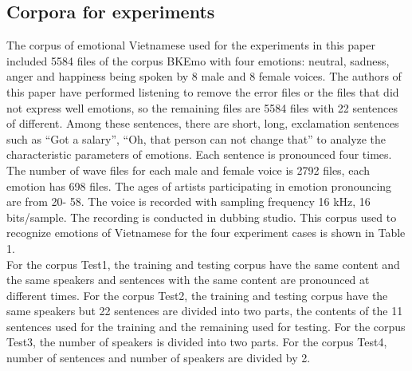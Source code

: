 \documentclass[a4paper,12pt]{article}
\begin{document}
\subsection{ Corpora for experiments}
The corpus of emotional Vietnamese used for the experiments in this paper included 5584
files of the corpus BKEmo \cite{8} with four emotions: neutral, sadness, anger and happiness
being spoken by 8 male and 8 female voices. The authors of this paper have performed
listening to remove the error files or the files that did not express well emotions, so the
remaining files are 5584 files with 22 sentences of different. Among these sentences, there are
short, long, exclamation sentences such as “Got a salary”, “Oh, that person can not change
that” to analyze the characteristic parameters of emotions. Each sentence is pronounced
four times. The number of wave files for each male and female voice is 2792 files, each
emotion has 698 files. The ages of artists participating in emotion pronouncing are from 20-
58. The voice is recorded with sampling frequency 16 kHz, 16 bits/sample. The recording is
conducted in dubbing studio. This corpus used to recognize emotions of Vietnamese for the
four experiment cases is shown in Table 1.
\\
 For the corpus Test1, the training and testing corpus have the same content and the
same speakers and sentences with the same content are pronounced at different times. For
the corpus Test2, the training and testing corpus have the same speakers but 22 sentences
are divided into two parts, the contents of the 11 sentences used for the training and the
remaining used for testing. For the corpus Test3, the number of speakers is divided into two
parts. For the corpus Test4, number of sentences and number of speakers are divided by 2.
\end{document}
